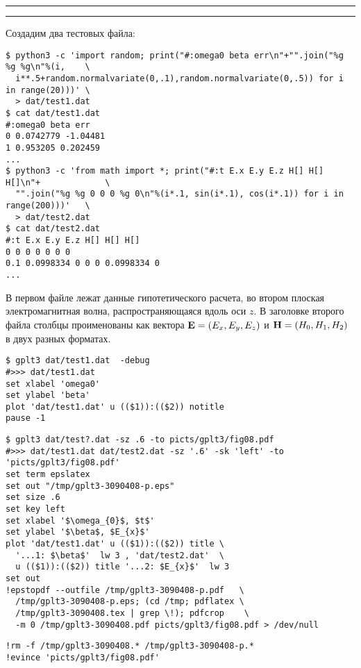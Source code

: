 \documentclass[12pt]{article}
\begin{document}
\noindent\rule{.45\textwidth}{1pt}\hfill \raisebox{-.45\height}{\bf № 5.}  \hfill\rule{.45\textwidth}{1pt}

\vspace{3mm}
Создадим два тестовых файла:
{\small
\begin{verbatim}
$ python3 -c 'import random; print("#:omega0 beta err\n"+"".join("%g %g %g\n"%(i,    \
  i**.5+random.normalvariate(0,.1),random.normalvariate(0,.5)) for i in range(20)))' \
  > dat/test1.dat
$ cat dat/test1.dat
#:omega0 beta err
0 0.0742779 -1.04481
1 0.953205 0.202459
...
$ python3 -c 'from math import *; print("#:t E.x E.y E.z H[] H[] H[]\n"+             \
  "".join("%g %g 0 0 0 %g 0\n"%(i*.1, sin(i*.1), cos(i*.1)) for i in range(200)))'   \
  > dat/test2.dat
$ cat dat/test2.dat
#:t E.x E.y E.z H[] H[] H[]
0 0 0 0 0 0 0
0.1 0.0998334 0 0 0 0.0998334 0
...
\end{verbatim}
}
В первом файле лежат данные гипотетического расчета, во втором плоская электромагнитная волна, распространяющаяся
вдоль оси $z$. В заголовке второго файла столбцы проименованы как вектора ${\bf E}=(E_x, E_y, E_z)$ и ${\bf H}=(H_0, H_1, H_2)$ в двух разных форматах.\\

\noindent
\begin{minipage}[b]{.69\textwidth}
  \small
\begin{verbatim}
$ gplt3 dat/test1.dat  -debug
#>>> dat/test1.dat
set xlabel 'omega0'
set ylabel 'beta'
plot 'dat/test1.dat' u (($1)):(($2)) notitle   
pause -1
\end{verbatim}
\end{minipage}
\begin{minipage}[b]{.54\textwidth}
  \small
\begin{verbatim}
$ gplt3 dat/test?.dat -sz .6 -to picts/gplt3/fig08.pdf
#>>> dat/test1.dat dat/test2.dat -sz '.6' -sk 'left' -to 'picts/gplt3/fig08.pdf'
set term epslatex 
set out "/tmp/gplt3-3090408-p.eps"
set size .6
set key left
set xlabel '$\omega_{0}$, $t$'
set ylabel '$\beta$, $E_{x}$'
plot 'dat/test1.dat' u (($1)):(($2)) title \
  '...1: $\beta$'  lw 3 , 'dat/test2.dat'  \
  u (($1)):(($2)) title '...2: $E_{x}$'  lw 3 
set out
!epstopdf --outfile /tmp/gplt3-3090408-p.pdf   \
  /tmp/gplt3-3090408-p.eps; (cd /tmp; pdflatex \
  /tmp/gplt3-3090408.tex | grep \!); pdfcrop    \
  -m 0 /tmp/gplt3-3090408.pdf picts/gplt3/fig08.pdf > /dev/null
\end{verbatim}
\end{minipage}
\begin{verbatim}
!rm -f /tmp/gplt3-3090408.* /tmp/gplt3-3090408-p.*
!evince 'picts/gplt3/fig08.pdf'
\end{verbatim}
\end{document}
